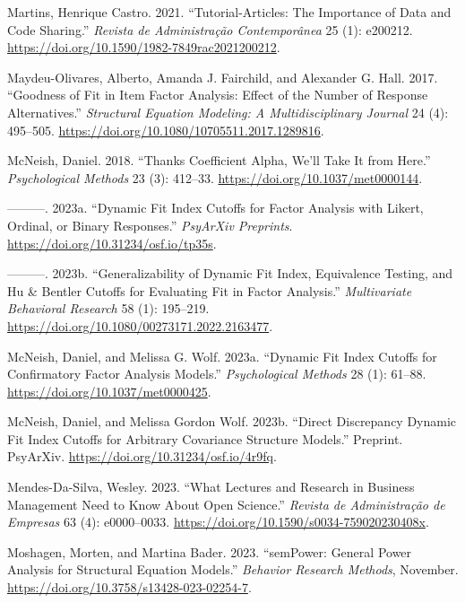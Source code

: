 \documentclass[
  a4paper,
]{article}
\newlength{\cslhangindent}
\newenvironment{CSLReferences}[2] %
 {\begin{list}{}{%
  \setlength{\itemindent}{0pt}
  \setlength{\leftmargin}{0pt}
  \setlength{\parsep}{0pt}
  \ifodd #1
   \setlength{\leftmargin}{\cslhangindent}
   \setlength{\itemindent}{-1\cslhangindent}
  \fi
  \setlength{\itemsep}{#2\baselineskip}}}
 {\end{list}}
\begin{document}
\begin{CSLReferences}{1}{0}
Martins, Henrique Castro. 2021. {``Tutorial-{Articles}: {The Importance}
of {Data} and {Code Sharing}.''} \emph{Revista de Administra{ç}{ã}o
Contempor{â}nea} 25 (1): e200212.
\url{https://doi.org/10.1590/1982-7849rac2021200212}.

Maydeu-Olivares, Alberto, Amanda J. Fairchild, and Alexander G. Hall.
2017. {``Goodness of {Fit} in {Item Factor Analysis}: {Effect} of the
{Number} of {Response Alternatives}.''} \emph{Structural Equation
Modeling: A Multidisciplinary Journal} 24 (4): 495--505.
\url{https://doi.org/10.1080/10705511.2017.1289816}.

McNeish, Daniel. 2018. {``Thanks Coefficient Alpha, {We}'ll Take It from
Here.''} \emph{Psychological Methods} 23 (3): 412--33.
\url{https://doi.org/10.1037/met0000144}.

---------. 2023a. {``Dynamic {Fit Index Cutoffs} for {Factor Analysis}
with {Likert}, {Ordinal}, or {Binary Responses}.''} \emph{PsyArXiv
Preprints}. \url{https://doi.org/10.31234/osf.io/tp35s}.

---------. 2023b. {``Generalizability of {Dynamic Fit Index},
{Equivalence Testing}, and {Hu} \& {Bentler Cutoffs} for {Evaluating
Fit} in {Factor Analysis}.''} \emph{Multivariate Behavioral Research} 58
(1): 195--219. \url{https://doi.org/10.1080/00273171.2022.2163477}.

McNeish, Daniel, and Melissa G. Wolf. 2023a. {``Dynamic Fit Index
Cutoffs for Confirmatory Factor Analysis Models.''} \emph{Psychological
Methods} 28 (1): 61--88. \url{https://doi.org/10.1037/met0000425}.

McNeish, Daniel, and Melissa Gordon Wolf. 2023b. {``Direct {Discrepancy
Dynamic Fit Index Cutoffs} for {Arbitrary Covariance Structure
Models}.''} Preprint. PsyArXiv.
\url{https://doi.org/10.31234/osf.io/4r9fq}.

Mendes-Da-Silva, Wesley. 2023. {``What {Lectures} and {Research} in
{Business Management Need} to {Know About Open Science}.''}
\emph{Revista de Administra{ç}{ã}o de Empresas} 63 (4): e0000--0033.
\url{https://doi.org/10.1590/s0034-759020230408x}.

Moshagen, Morten, and Martina Bader. 2023. {``{semPower}: {General}
Power Analysis for Structural Equation Models.''} \emph{Behavior
Research Methods}, November.
\url{https://doi.org/10.3758/s13428-023-02254-7}.


\end{CSLReferences}
\end{document}
